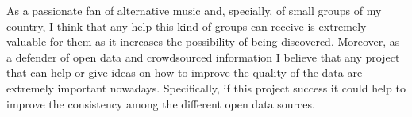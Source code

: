 \documentclass[paper=a4,fontsize=11pt]{scrartcl}
\numberwithin{equation}{section}		%
\numberwithin{figure}{section}			%
\numberwithin{table}{section}				%
\begin{document}
As a passionate fan of alternative music and, specially, of small groups of my country, I think that any help this kind of groups can receive is extremely valuable for them as it increases the possibility of being discovered. 
Moreover, as a defender of open data and crowdsourced information I believe that any project that can help or give ideas on how to improve the quality of the data are extremely important nowadays. 
Specifically, if this project success it could help to improve the consistency among the different open data sources.

{\tiny\printbibliography}
\end{document}
